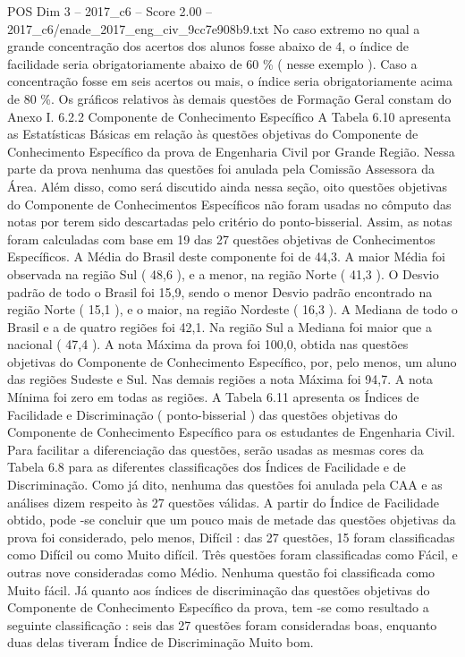 \begin{textsample}{POS Dim 3 – 2017\_c6 – Score 2.00 – 2017\_c6/enade\_2017\_eng\_civ\_9cc7e908b9.txt}
No caso extremo no qual a grande concentração dos acertos dos alunos fosse abaixo de 4, o índice de facilidade seria obrigatoriamente abaixo de 60 \% ( nesse exemplo ).
Caso a concentração fosse em seis acertos ou mais, o índice seria obrigatoriamente acima de 80 \%.
Os gráficos relativos às demais questões de Formação Geral constam do Anexo I. 6.2.2 Componente de Conhecimento Específico A Tabela 6.10 apresenta as Estatísticas Básicas em relação às questões objetivas do Componente de Conhecimento Específico da prova de Engenharia Civil por Grande Região.
Nessa parte da prova nenhuma das questões foi anulada pela Comissão Assessora da Área.
Além disso, como será discutido ainda nessa seção, oito questões objetivas do Componente de Conhecimentos Específicos não foram usadas no cômputo das notas por terem sido descartadas pelo critério do ponto-bisserial.
Assim, as notas foram calculadas com base em 19 das 27 questões objetivas de Conhecimentos Específicos.
A Média do Brasil deste componente foi de 44,3.
A maior Média foi observada na região Sul ( 48,6 ), e a menor, na região Norte ( 41,3 ).
O Desvio padrão de todo o Brasil foi 15,9, sendo o menor Desvio padrão encontrado na região Norte ( 15,1 ), e o maior, na região Nordeste ( 16,3 ).
A Mediana de todo o Brasil e a de quatro regiões foi 42,1.
Na região Sul a Mediana foi maior que a nacional ( 47,4 ).
A nota Máxima da prova foi 100,0, obtida nas questões objetivas do Componente de Conhecimento Específico, por, pelo menos, um aluno das regiões Sudeste e Sul.
Nas demais regiões a nota Máxima foi 94,7.
A nota Mínima foi zero em todas as regiões.
A Tabela 6.11 apresenta os Índices de Facilidade e Discriminação ( ponto-bisserial ) das questões objetivas do Componente de Conhecimento Específico para os estudantes de Engenharia Civil.
Para facilitar a diferenciação das questões, serão usadas as mesmas cores da Tabela 6.8 para as diferentes classificações dos Índices de Facilidade e de Discriminação.
Como já dito, nenhuma das questões foi anulada pela CAA e as análises dizem respeito às 27 questões válidas.
A partir do Índice de Facilidade obtido, pode -se concluir que um pouco mais de metade das questões objetivas da prova foi considerado, pelo menos, Difícil : das 27 questões, 15 foram classificadas como Difícil ou como Muito difícil.
Três questões foram classificadas como Fácil, e outras nove consideradas como Médio.
Nenhuma questão foi classificada como Muito fácil.
Já quanto aos índices de discriminação das questões objetivas do Componente de Conhecimento Específico da prova, tem -se como resultado a seguinte classificação : seis das 27 questões foram consideradas boas, enquanto duas delas tiveram Índice de Discriminação Muito bom.

\end{textsample}
